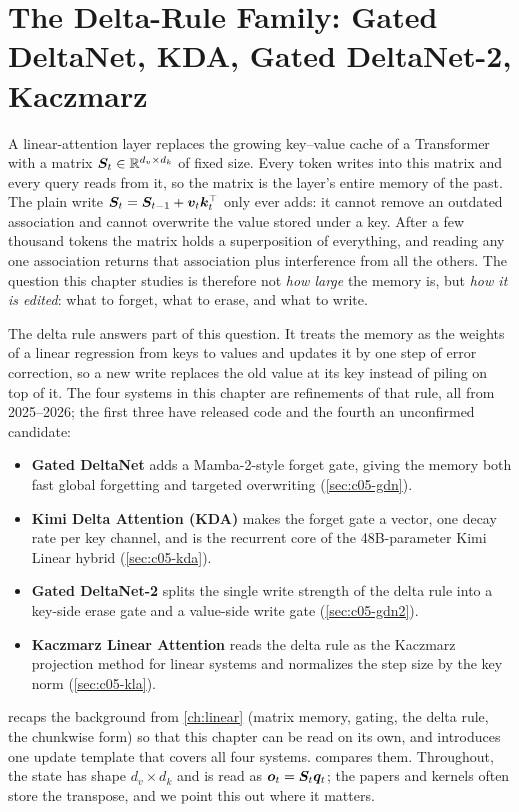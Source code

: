 \chapter{The Delta-Rule Family: Gated DeltaNet, KDA, Gated DeltaNet-2, Kaczmarz}\label{ch:delta}

A linear-attention layer replaces the growing key--value cache of a Transformer with a matrix
$\bm{S}_t \in \mathbb{R}^{d_v \times d_k}$ of fixed size. Every token writes into this matrix and every
query reads from it, so the matrix is the layer's entire memory of the past. The plain write
$\bm{S}_t = \bm{S}_{t-1} + \bm{v}_t\bm{k}_t^{\top}$ only ever adds: it cannot remove an outdated association and
cannot overwrite the value stored under a key. After a few thousand tokens the matrix holds a
superposition of everything, and reading any one association returns that association plus
interference from all the others. The question this chapter studies is therefore not
\emph{how large} the memory is, but \emph{how it is edited}: what to forget, what to erase, and
what to write.

The delta rule answers part of this question. It treats the memory as the weights of a linear
regression from keys to values and updates it by one step of error correction, so a new write
replaces the old value at its key instead of piling on top of it. The four systems in this
chapter are refinements of that rule, all from 2025--2026; the first three have released code
and the fourth an unconfirmed candidate:
\begin{itemize}
  \item \textbf{Gated DeltaNet} \citep{yang2025gdn} adds a Mamba-2-style forget gate, giving the
  memory both fast global forgetting and targeted overwriting (\cref{sec:c05-gdn}).
  \item \textbf{Kimi Delta Attention (KDA)} \citep{kimi2025linear} makes the forget gate a vector,
  one decay rate per key channel, and is the recurrent core of the 48B-parameter Kimi Linear
  hybrid (\cref{sec:c05-kda}).
  \item \textbf{Gated DeltaNet-2} \citep{hatamizadeh2026gdn2} splits the single write strength of
  the delta rule into a key-side erase gate and a value-side write gate (\cref{sec:c05-gdn2}).
  \item \textbf{Kaczmarz Linear Attention} \citep{zou2026kaczmarz} reads the delta rule as the
  Kaczmarz projection method for linear systems and normalizes the step size by the key norm
  (\cref{sec:c05-kla}).
\end{itemize}
 recaps the background from \cref{ch:linear} (matrix memory, gating, the
delta rule, the chunkwise form) so that this chapter can be read on its own, and introduces one
update template that covers all four systems.  compares them. Throughout,
the state has shape $d_v \times d_k$ and is read as $\bm{o}_t = \bm{S}_t\bm{q}_t$; the papers and kernels
often store the transpose, and we point this out where it matters.

